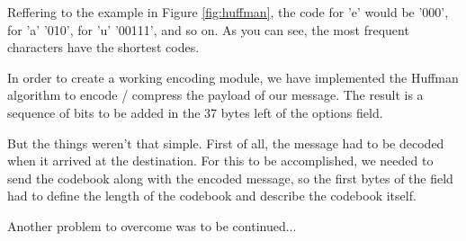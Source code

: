Reffering to the example in Figure \ref{fig:huffman}, the code for 'e' would
be '000', for 'a' '010', for 'u' '00111', and so on. As you can see, the most
frequent characters have the shortest codes.

In order to create a working encoding module, we have implemented the Huffman
algorithm to encode / compress the payload of our message. The result is a
sequence of bits to be added in the 37 bytes left of the options field.

But the things weren't that simple. First of all, the message had to be decoded
when it arrived at the destination. For this to be accomplished, we needed to
send the codebook along with the encoded message, so the first bytes of the
field had to define the length of the codebook and describe the codebook itself.

Another problem to overcome was to be continued...








